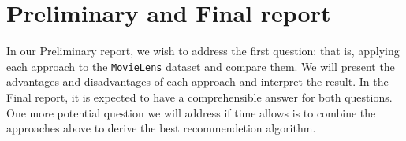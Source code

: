 \documentclass[bj, preprint]{imsart}
\begin{document}


\section{Preliminary and Final report}\label{sec:report}
In our Preliminary report, we wish to address the first question: that is, applying each approach to the \texttt{MovieLens} dataset and compare them. We will present the advantages and disadvantages of each approach and interpret the result. In the Final report, it is expected to have a comprehensible answer for both questions. One more potential question we will address if time allows is to combine the approaches above to derive the best recommendetion algorithm. 


{}
\end{document}
